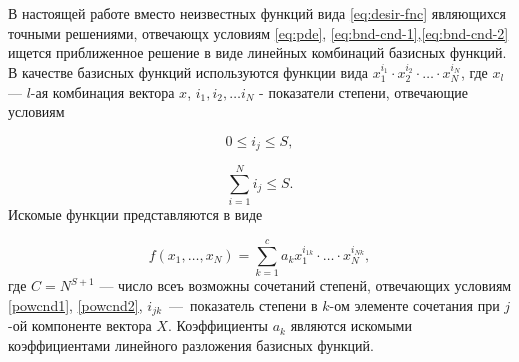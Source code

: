 \documentclass[a4paper,12pt]{article}
\begin{document}
В настоящей работе вместо неизвестных функций вида \eqref{eq:desir-fnc}
являющихся точными решениями, отвечающх условиям \eqref{eq:pde},
\eqref{eq:bnd-cnd-1},\eqref{eq:bnd-cnd-2} ищется приближенное решение
в виде линейных комбинаций базисных функций. В качестве базисных функций
используются функции вида $x^{i_1}_1 \cdot x^{i_2}_2 \cdot \ldots \cdot
x^{i_N}_N$, где $x_l$ --- $l$-ая комбинация вектора $x$, $i_1,i_2,\ldots
i_N$ - показатели степени, отвечающие условиям

\begin{equation}
    0 \le i_j \le S,
    \label{powcnd1}
\end{equation}

\begin{equation}
    \sum^{N}_{i=1} i_j \le S.
    \label{powcnd2}
\end{equation}
Искомые функции представляются в виде

\begin{equation}
    f(x_1,\ldots,x_N)=\sum^{c}_{k=1} a_kx^{i_{1k}}_1 
    \cdot\ldots\cdot x^{i_{Nk}}_N,
\end{equation}
где $C=N^{S+1}$ --- число всеъ возможны сочетаний степенй, отвечающих 
условиям \eqref{powcnd1}, \eqref{powcnd2}, $i_{jk}$~---~показатель степени
в $k$-ом элементе сочетания при $j$-ой компоненте вектора $X$. Коэффициенты
$a_k$ являются искомыми коэффициентами линейного разложения базисных 
функций.
\end{document}
